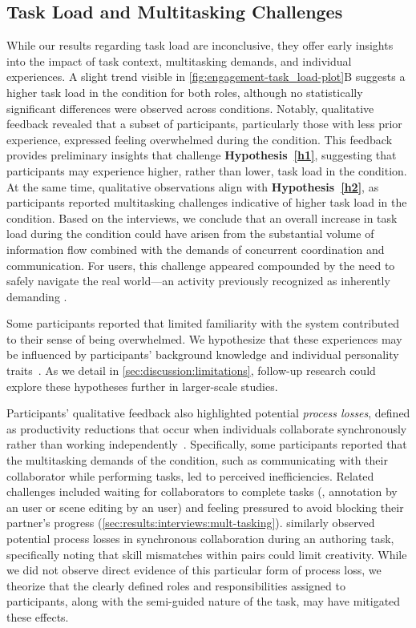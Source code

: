 \subsection{Task Load and Multitasking Challenges}
While our results regarding task load are inconclusive, they offer early insights into the impact of task context, multitasking demands, and individual experiences. A slight trend visible in \cref{fig:engagement-task_load-plot}B suggests a higher task load in the \sync condition for both roles, although no statistically significant differences were observed across conditions. Notably, qualitative feedback revealed that a subset of participants, particularly those with less prior experience, expressed feeling overwhelmed during the \sync{} condition. This feedback provides preliminary insights that challenge \textbf{Hypothesis~\ref{h1}}, suggesting that \exsitu{} participants may experience higher, rather than lower, task load in the \sync{} condition. At the same time, qualitative observations align with \textbf{Hypothesis~\ref{h2}}, as \insitu{} participants reported multitasking challenges indicative of higher task load in the \sync{} condition. Based on the interviews, we conclude that an overall increase in task load during the \sync{} condition could have arisen from the substantial volume of information flow combined with the demands of concurrent coordination and communication. For \insitu users, this challenge appeared compounded by the need to safely navigate the real world---an activity previously recognized as inherently demanding \cite{makhmutovSafetyRisksLocationBased2021}.

Some participants reported that limited familiarity with the system contributed to their sense of being overwhelmed. We hypothesize that these experiences may be influenced by participants' background knowledge and individual personality traits~\cite{johnBigFiveTrait1999}. As we detail in \cref{sec:discussion:limitations}, follow-up research could explore these hypotheses further in larger-scale studies.

Participants' qualitative feedback also highlighted potential \textit{process losses}, defined as productivity reductions that occur when individuals collaborate synchronously rather than working independently~\cite{steinerGroupProcessProductivity1972}. Specifically, some participants reported that the multitasking demands of the \sync{} condition, such as communicating with their collaborator while performing tasks, led to perceived inefficiencies. Related challenges included waiting for collaborators to complete tasks (\eg, annotation by an \insitu{} user or scene editing by an \exsitu{} user) and feeling pressured to avoid blocking their partner's progress (\cref{sec:results:interviews:mult-tasking}). 
\citet{guoBlocksCollaborativePersistent2019} similarly observed potential process losses in synchronous collaboration during an authoring task, specifically noting that skill mismatches within pairs could limit creativity. While we did not observe direct evidence of this particular form of process loss, we theorize that the clearly defined roles and responsibilities assigned to participants, along with the semi-guided nature of the task, may have mitigated these effects.

